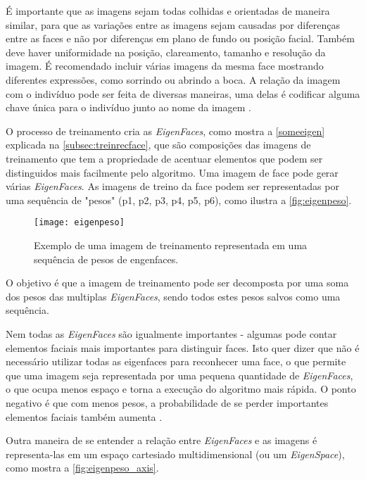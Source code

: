 É importante que as imagens sejam todas colhidas e orientadas de maneira similar, para que as variações entre as imagens sejam causadas por diferenças entre as faces e não por diferenças  em plano de fundo ou posição facial. Também deve haver uniformidade na posição, clareamento, tamanho e resolução da imagem. É recomendado incluir várias imagens da mesma face mostrando diferentes expressões, como sorrindo ou abrindo a boca. A relação da imagem com o indivíduo pode ser feita de diversas maneiras, uma delas é codificar alguma chave única para o indivíduo junto ao nome da imagem \cite{drmathew_java_programming}. 

O processo de treinamento cria as \textit{EigenFaces}, como mostra a \autoref{someeigen} explicada na  \autoref{subsec:treinrecface}, que são composições das imagens de treinamento que tem a propriedade de acentuar elementos que podem ser distinguidos mais facilmente pelo algoritmo. Uma imagem de face pode gerar várias \textit{EigenFaces}. As imagens de treino da face podem ser representadas por uma sequência de "pesos" (p1, p2, p3, p4, p5, p6), como ilustra a \autoref{fig:eigenpeso}.

\begin{figure}[h]
	\centering
	\texttt{[image: eigenpeso]}
	\caption{Exemplo de uma imagem de treinamento representada em uma sequência de pesos de engenfaces.}
	\label{fig:eigenpeso}
\end{figure}

O objetivo é que a imagem de treinamento pode ser decomposta por uma soma dos pesos das multiplas \textit{EigenFaces}, sendo todos estes pesos salvos como uma sequência.

Nem todas as \textit{EigenFaces} são igualmente importantes - algumas pode contar elementos faciais mais importantes para distinguir faces. Isto quer dizer que não é necessário utilizar todas as eigenfaces para reconhecer uma face, o que permite que uma imagem seja representada por uma pequena quantidade de \textit{EigenFaces}, o que ocupa menos espaço e torna a execução do algoritmo mais rápida. O ponto negativo é que com menos pesos, a probabilidade de se perder importantes elementos faciais também aumenta \cite{drmathew_java_programming}.

Outra maneira de se entender a relação entre \textit{EigenFaces} e as imagens é representa-las em um espaço cartesiado multidimensional (ou um \textit{\textit{EigenSpace}}), como mostra a \autoref{fig:eigenpeso_axis}.

